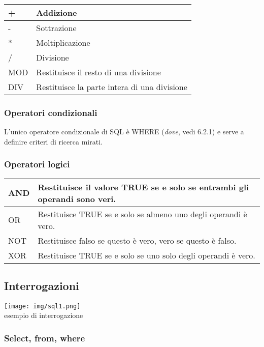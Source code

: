 \documentclass[a4paper]{article}
\begin{document}
\begin{tabularx}{350pt}{|l|X|}
  \hline
  + & Addizione\\
  \hline
  - & Sottrazione\\
  \hline
  * & Moltiplicazione\\
  \hline
  / & Divisione\\
  \hline
  MOD & Restituisce il resto di una divisione\\
  \hline
  DIV & Restituisce la parte intera di una divisione\\
  \hline
\end{tabularx}\par \subsubsection{Operatori condizionali}
L'unico operatore condizionale di SQL è WHERE (\emph{dove}, vedi 6.2.1) e serve a definire criteri di ricerca mirati.\par \subsubsection{Operatori logici}
\begin{tabularx}{350pt}{|l|X|}
  \hline
  AND & Restituisce il valore TRUE se e solo se entrambi gli operandi sono veri.\\
  \hline
  OR & Restituisce TRUE se e solo se almeno uno degli operandi è vero.\\
  \hline
  NOT & Restituisce falso se questo è vero, vero se questo è falso.\\
  \hline
  XOR & Restituisce TRUE se e solo se uno solo degli operandi è vero.\\
  \hline
\end{tabularx}\par \subsection{Interrogazioni}
\begin{center}
      \texttt{[image: img/sql1.png]}\\
      esempio di interrogazione
\end{center}\par \subsubsection{Select, from, where}
\end{document}
